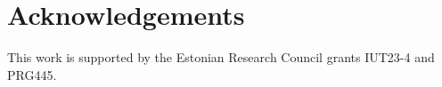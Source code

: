 \section*{Acknowledgements}

This work is supported by the Estonian Research Council grants IUT23-4 and PRG445.

